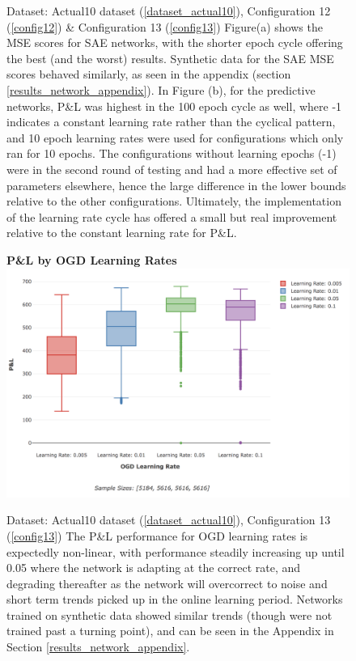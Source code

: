 \documentclass[a4paper,11pt,oneside]{article}
\theoremstyle{plain}
\theoremstyle{definition}
\begin{document}
\begin{figure}[H]
\begin{subfigure}{.5\textwidth}
{			\newline }
		\label{figure-actual_pl_lr_epochs}
	\end{subfigure}
	\caption[Effects of Epoch Cycle Lengths (Actual Data)]{Dataset: Actual10 dataset (\ref{dataset_actual10}), Configuration 12 (\ref{config12}) \& Configuration 13 (\ref{config13})
		\newline Figure(a) shows the MSE scores for SAE networks, with the shorter epoch cycle offering the best (and the worst) results. Synthetic data for the SAE MSE scores behaved similarly, as seen in the appendix (section \ref{results_network_appendix}). 
		\newline In Figure (b), for the predictive networks, P\&L was highest in the 100 epoch cycle as well, where -1 indicates a constant learning rate rather than the cyclical pattern, and 10 epoch learning rates were used for configurations which only ran for 10 epochs. The configurations without learning epochs (-1) were in the second round of testing and had a more effective set of parameters elsewhere, hence the large difference in the lower bounds relative to the other configurations. Ultimately, the implementation of the learning rate cycle has offered a small but real improvement relative to the constant learning rate for P\&L.}
	\label{figure-epochs_lr}
\end{figure}


\begin{figure}[H]
	\textbf{P\&L by OGD Learning Rates}
	\centering
	\includegraphics[scale=0.45]{images/results/network/lr/actual_ogd_lr.png}
	\caption[P\&L by OGD Learning Rates]{Dataset: Actual10 dataset (\ref{dataset_actual10}), Configuration 13 (\ref{config13})
		\newline The P\&L performance for OGD learning rates is expectedly non-linear, with performance steadily increasing up until 0.05 where the network is adapting at the correct rate, and degrading thereafter as the network will overcorrect to noise and short term trends picked up in the online learning period. Networks trained on synthetic data showed similar trends (though were not trained past a turning point), and can be seen in the Appendix in Section \ref{results_network_appendix}.}
	\label{figure-actual_ogd_lr}
\end{figure}
\end{document}
